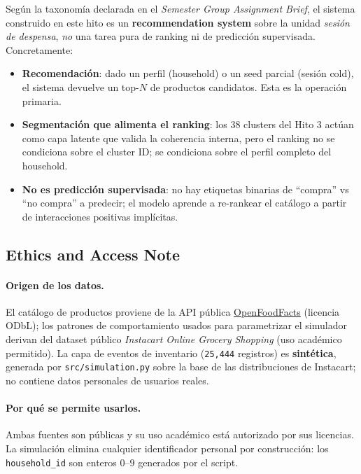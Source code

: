 \documentclass[12pt,a4paper]{article}
\newcommand{\code}[1]{\texttt{\small #1}}
\begin{document}
Según la taxonomía declarada en el \textit{Semester Group Assignment Brief}, el sistema construido en este hito es un \textbf{recommendation system} sobre la unidad \textit{sesión de despensa}, \emph{no} una tarea pura de ranking ni de predicción supervisada. Concretamente:

\begin{itemize}
    \item \textbf{Recomendación}: dado un perfil (household) o un seed parcial (sesión cold), el sistema devuelve un top-$N$ de productos candidatos. Esta es la operación primaria.
    \item \textbf{Segmentación que alimenta el ranking}: los 38 clusters del Hito 3 actúan como capa latente que valida la coherencia interna, pero el ranking no se condiciona sobre el cluster ID; se condiciona sobre el perfil completo del household.
    \item \textbf{No es predicción supervisada}: no hay etiquetas binarias de ``compra'' vs ``no compra'' a predecir; el modelo aprende a re-rankear el catálogo a partir de interacciones positivas implícitas.
\end{itemize}

\subsection{Ethics and Access Note}

\paragraph{Origen de los datos.} El catálogo de productos proviene de la API pública \href{https://world.openfoodfacts.org/}{OpenFoodFacts} (licencia ODbL); los patrones de comportamiento usados para parametrizar el simulador derivan del dataset público \textit{Instacart Online Grocery Shopping} (uso académico permitido). La capa de eventos de inventario (\code{25{,}444} registros) es \textbf{sintética}, generada por \code{src/simulation.py} sobre la base de las distribuciones de Instacart; no contiene datos personales de usuarios reales.

\paragraph{Por qué se permite usarlos.} Ambas fuentes son públicas y su uso académico está autorizado por sus licencias. La simulación elimina cualquier identificador personal por construcción: los \code{household\_id} son enteros $0$--$9$ generados por el script.
\end{document}
